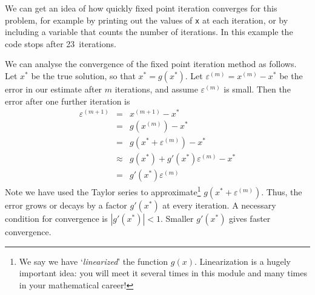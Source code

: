 We can get an idea of how quickly fixed point iteration converges for this problem,
for example by printing out the values of \texttt{x} at each iteration, or by including a
variable that counts the number of iterations. In this example the code stops
after 23~iterations.


\vspace{3mm}

We can analyse the convergence of the fixed point iteration method as follows.
Let $ x^{\mathrm{*}} $ be the true solution, so that $x^{\mathrm{*}} = g(x^{\mathrm{*}})$.
Let $\varepsilon^{(m)} = x^{(m)} - x^{\mathrm{*}}$ be the error in our estimate after
$m$ iterations, and assume $\varepsilon^{(m)}$ is small.
Then the error after one
further iteration is
\begin{eqnarray}
\varepsilon^{(m+1)} & = & x^{(m+1)} - x^{\mathrm{*}} \nonumber \\
                    & = & g(x^{(m)}) - x^{\mathrm{*}} \nonumber \\
                    & = & g( x^{\mathrm{*}} + \varepsilon^{(m)} ) - x^{\mathrm{*}} \nonumber \\
                    & \approx & g( x^{\mathrm{*}} ) + g'(x^{\mathrm{*}}) \varepsilon^{(m)}
                                                  - x^{\mathrm{*}} \nonumber \\
                    & = & g'(x^{\mathrm{*}}) \varepsilon^{(m)} \nonumber
\end{eqnarray}
Note we have used the Taylor series to approximate\footnote{
We say we have `\textit{linearized}' the function $g(x)$.
Linearization is a hugely important idea: 
you will meet it several times in this module and many times
in your mathematical career!}
$g( x^{\mathrm{*}} + \varepsilon^{(m)} )$.
Thus, the error grows or decays by a factor $g'(x^{\mathrm{*}})$ at every iteration.
A necessary condition for convergence is $|g'(x^{\mathrm{*}})| < 1$. Smaller
$g'(x^{\mathrm{*}})$ gives faster convergence.



